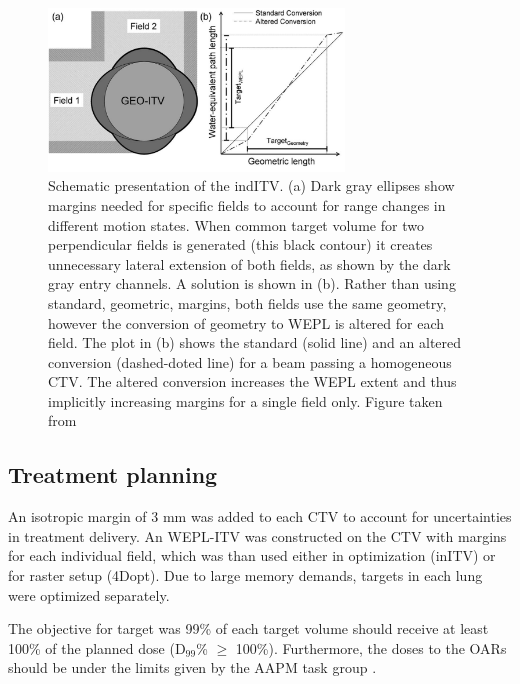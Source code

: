 \begin{figure}[H]
	\begin{center}
		\includegraphics[width=0.7\textwidth]{./ComplexPatients/Images/weplITV.png}
		\caption{Schematic presentation of the indITV. (a) Dark gray ellipses show margins needed for specific fields to account for range changes in different motion states.
		When common target volume for two perpendicular fields is generated (this black contour) it creates unnecessary lateral extension of both fields, as shown by the dark gray
		entry channels. A solution is shown in (b). Rather than using standard, geometric, margins, both fields use the same geometry, however the conversion of geometry to WEPL
		is altered for each field. The plot in (b) shows the standard (solid line) and an altered conversion (dashed-doted line) for a beam passing a homogeneous CTV. The altered conversion
		increases the WEPL extent and thus implicitly increasing margins for a single field only. Figure taken from \cite{Graeff2012}}
		\label{Fig:weplITV}
	\end{center}
\end{figure}

\subsection{Treatment planning}

An isotropic margin of 3 mm was added to each CTV to account for uncertainties in treatment delivery. An WEPL-ITV was constructed on the CTV with margins for each individual field, which was than used either in optimization (inITV)
or for raster setup (4Dopt). Due to large memory demands, targets in each lung were optimized separately. 
  
The objective for target was 99\% of each target volume should receive at least 100\% of the planned dose (D$_{99}$\% $\geq$ 100\%). Furthermore, the doses to the OARs should be under the limits given by the AAPM task group \cite{Benedict2010}. 
 
